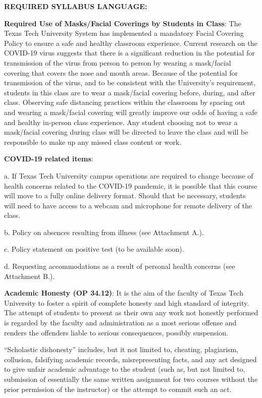 \documentclass[11pt]{NSF}
\begin{document}
{\bf REQUIRED SYLLABUS LANGUAGE:}

{\bf Required Use of Masks/Facial Coverings by Students in Class}:
The Texas Tech University System has implemented a mandatory Facial
Covering Policy to ensure a safe and healthy classroom experience.
Current research on the COVID-19 virus suggests that there is a
significant reduction in the potential for transmission of the virus
from person to person by wearing a mask/facial covering that covers
the nose and mouth areas. Because of the potential for transmission of
the virus, and to be consistent with the University’s requirement,
students in this class are to wear a mask/facial covering before,
during, and after class. Observing safe distancing practices within
the classroom by spacing out and wearing a mask/facial covering will
greatly improve our odds of having a safe and healthy in-person class
experience. Any student choosing not to wear a mask/facial covering
during class will be directed to leave the class and will be
responsible to make up any missed class content or work.

{\bf COVID-19 related items}:

a. If Texas Tech University campus operations are required to change
because of health concerns related to the COVID-19 pandemic, it is
possible that this course will move to a fully online delivery format.
Should that be necessary, students will need to have access to a
webcam and microphone for remote delivery of the class. 

b. Policy on absences resulting from illness (see Attachment A.).

c. Policy statement on positive test (to be available soon).

d. Requesting accommodations as a result of personal health concerns
(see Attachment B.). 

{\bf Academic Honesty (OP 34.12)}:
It is the aim of the faculty of Texas Tech University to foster a
spirit of complete honesty and high standard of integrity. The attempt
of students to present as their own any work not honestly performed is
regarded by the faculty and administration as a most serious offense
and renders the offenders liable to serious consequences, possibly
suspension. 

“Scholastic dishonesty” includes, but it not limited to,
cheating, plagiarism, collusion, falsifying academic records,
misrepresenting facts, and any act designed to give unfair academic
advantage to the student (such as, but not limited to, submission of
essentially the same written assignment for two courses without the
prior permission of the instructor) or the attempt to commit such an
act.  
\end{document}
